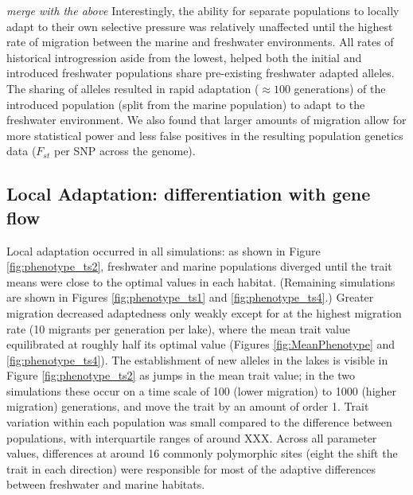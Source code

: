 \documentclass{article}
\newcommand{\plr}[1]{\todo[linecolor=blue,backgroundcolor=blue!25,bordercolor=blue]{#1}}
\begin{document}
\emph{merge with the above}
Interestingly, the ability for separate populations to locally adapt to their own selective pressure was relatively unaffected 
until the highest rate of migration between the marine and freshwater environments.
All rates of historical introgression aside from the lowest, helped both the initial and introduced freshwater populations 
share pre-existing freshwater adapted alleles.
The sharing of alleles resulted in rapid adaptation ($\approx 100$ generations) of the introduced population (split from the marine population) to adapt to the freshwater environment.
We also found that larger amounts of migration allow for more statistical power and less false positives in the resulting population genetics data ($F_{st}$ per SNP across the genome).



\subsection*{Local Adaptation: differentiation with gene flow}


Local adaptation occurred in all simulations:
as shown in Figure \ref{fig:phenotype_ts2},
freshwater and marine populations diverged
until the trait means were close to the optimal values in each habitat. 
(Remaining simulations are shown in Figures \ref{fig:phenotype_ts1} and \ref{fig:phenotype_ts4}.)
Greater migration decreased adaptedness only weakly
except for at the highest migration rate (10 migrants per generation per lake),
where the mean trait value equilibrated at roughly half its optimal value 
(Figures \ref{fig:MeanPhenotype} and \ref{fig:phenotype_ts4}).
The establishment of new alleles in the lakes is visible in Figure \ref{fig:phenotype_ts2}
as jumps in the mean trait value;
in the two simulations these occur on a time scale of 100 (lower migration) to 1000 (higher migration)
generations,
and move the trait by an amount of order 1.
Trait variation within each population was small compared to the difference between populations,
with interquartile ranges of around XXX.\plr{TODO}
Across all parameter values, differences at around 16 commonly polymorphic sites 
(eight the shift the trait in each direction)
were responsible for most of the adaptive differences between freshwater and marine habitats.
\plr{ALSO TODO: CHECK THIS}
\end{document}

